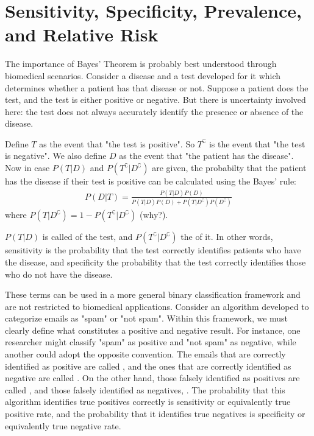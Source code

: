 \section{Sensitivity, Specificity, Prevalence, and Relative Risk}

The importance of Bayes' Theorem is probably best understood through biomedical scenarios.
Consider a disease and a test developed for it which determines whether a patient has that disease or not.
Suppose a patient does the test, and the test is either positive or negative.
But there is uncertainty involved here:
the test does not always accurately identify the presence or absence of the disease.

Define \( T \) as the event that "the test is positive".
So \( T^\complement \) is the event that "the test is negative".
We also define \( D \) as the event that "the patient has the disease".
Now in case \( P(T | D) \) and \( P(T^\complement | D^\complement) \) are given,
the probabilty that the patient has the disease if their test is positive can be calculated using the Bayes' rule:
\begin{gather*}
	P(D | T) = \frac{P(T | D)P(D)}{P(T | D)P(D) + P(T | D^\complement)P(D^\complement)}
\end{gather*}
where \( P(T | D^\complement) = 1 - P(T^\complement | D^\complement) \) (why?).

\( P(T | D) \) is called  of the test, and \( P(T^\complement | D^\complement) \) the  of it.
In other words, sensitivity is the probability that the test correctly identifies patients who have the disease,
and specificity the probability that the test correctly identifies those who do not have the disease.

These terms can be used in a more general binary classification framework and are not restricted to biomedical applications.
Consider an algorithm developed to categorize emails as "spam" or "not spam".
Within this framework, we must clearly define what constitutes a positive and negative result.
For instance, one researcher might classify "spam" as positive and "not spam" as negative, while another could adopt the opposite convention.
The emails that are correctly identified as positive are called ,
and the ones that are correctly identified as negative are called .
On the other hand, those falsely identified as positives are called ,
and those falsely identified as negatives, .
The probability that this algorithm identifies true positives correctly is sensitivity or equivalently true positive rate,
and the probability that it identifies true negatives is specificity or equivalently true negative rate.

